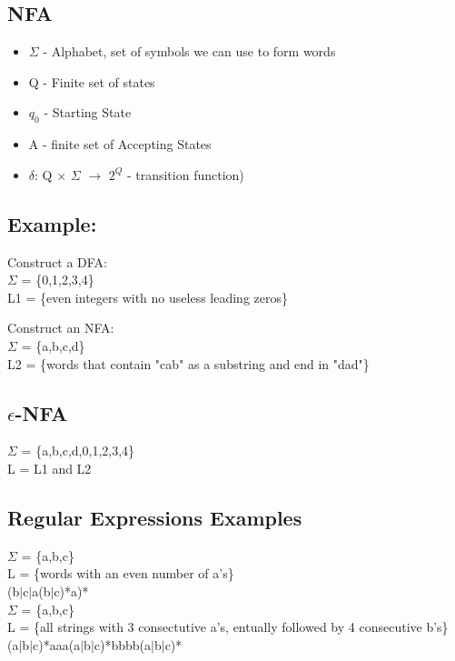 \documentclass[12pt]{article}
\begin{document}
	\subsection*{NFA}
	\begin{itemize}
		\item $\Sigma$ - Alphabet, set of symbols we can use to form words
		\item Q - Finite set of states
		\item $q_0$ - Starting State
		\item A - finite set of Accepting States
		\item $\delta$: Q $\times$ $\Sigma$ $\rightarrow$ $2^Q$ - transition function)
	\end{itemize}
	
	\subsection*{Example:}
	Construct a DFA:\\
	$\Sigma$ = \{0,1,2,3,4\}\\
	L1 = \{even integers with no useless leading zeros\}
	
	Construct an NFA:\\
	$\Sigma$ = \{a,b,c,d\}\\
	L2 = \{words that contain "cab" as a substring and end in "dad"\}\\
	
	\subsection*{$\epsilon$-NFA}
	$\Sigma$ = \{a,b,c,d,0,1,2,3,4\}\\
	L = L1 and L2\\
	
	\subsection*{Regular Expressions Examples}
	$\Sigma$ = \{a,b,c\}\\
	L = \{words with an even number of a's\}\\
	
	(b$|$c$|$a(b$|$c)*a)*\\
	
	$\Sigma$ = \{a,b,c\}\\
	L = \{all strings with 3 consectutive a's, entually followed by 4 consecutive b's\}\\
	
	(a$|$b$|$c)*aaa(a$|$b$|$c)*bbbb(a$|$b$|$c)*
	
\end{document}
